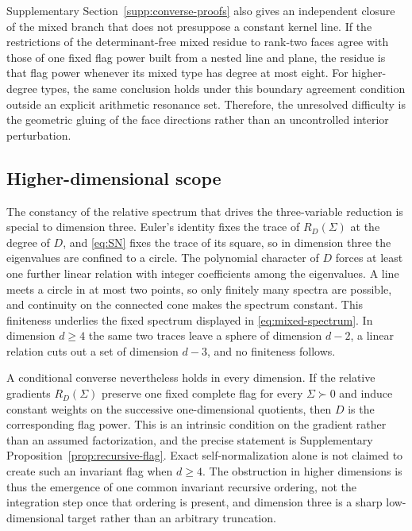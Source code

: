 \documentclass[12pt,a4paper]{article}
\theoremstyle{plain}
\theoremstyle{definition}
\begin{document}
Supplementary Section~\ref{supp:converse-proofs} also gives an independent closure of the mixed branch that does not presuppose a constant kernel line.
If the restrictions of the determinant-free mixed residue to rank-two faces agree with those of one fixed flag power built from a nested line and plane, the residue is that flag power whenever its mixed type has degree at most eight.
For higher-degree types, the same conclusion holds under this boundary agreement condition outside an explicit arithmetic resonance set.
Therefore, the unresolved difficulty is the geometric gluing of the face directions rather than an uncontrolled interior perturbation.

\subsection{Higher-dimensional scope}
The constancy of the relative spectrum that drives the three-variable reduction is special to dimension three.
Euler's identity fixes the trace of $R_D(\Sigma)$ at the degree of $D$, and \eqref{eq:SN} fixes the trace of its square, so in dimension three the eigenvalues are confined to a circle.
The polynomial character of $D$ forces at least one further linear relation with integer coefficients among the eigenvalues.
A line meets a circle in at most two points, so only finitely many spectra are possible, and continuity on the connected cone makes the spectrum constant.
This finiteness underlies the fixed spectrum displayed in \eqref{eq:mixed-spectrum}.
In dimension $d\ge 4$ the same two traces leave a sphere of dimension $d-2$, a linear relation cuts out a set of dimension $d-3$, and no finiteness follows.

A conditional converse nevertheless holds in every dimension.
If the relative gradients $R_D(\Sigma)$ preserve one fixed complete flag for every $\Sigma\succ0$ and induce constant weights on the successive one-dimensional quotients, then $D$ is the corresponding flag power.
This is an intrinsic condition on the gradient rather than an assumed factorization, and the precise statement is Supplementary Proposition~\ref{prop:recursive-flag}.
Exact self-normalization alone is not claimed to create such an invariant flag when $d\ge 4$.
The obstruction in higher dimensions is thus the emergence of one common invariant recursive ordering, not the integration step once that ordering is present, and dimension three is a sharp low-dimensional target rather than an arbitrary truncation.
\end{document}
